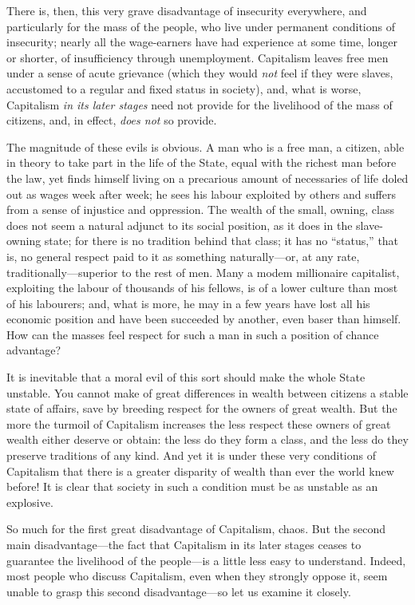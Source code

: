 \documentclass{book}
\begin{document}
There is, then, this very grave disadvantage of insecurity everywhere, and particularly for the mass of the people, who live under permanent conditions of insecurity; nearly all the wage-earners have had experience at some time, longer or shorter, of insufficiency through unemployment. Capitalism leaves free men under a sense of acute grievance (which they would \emph{not} feel if they were slaves, accustomed to a regular and fixed status in society), and, what is worse, Capitalism \emph{in its later stages} need not provide for the livelihood of the mass of citizens, and, in effect, \emph{does not} so provide.

The magnitude of these evils is obvious. A man who is a free man, a citizen, able in theory to take part in the life of the State, equal with the richest man before the law, yet finds himself living on a precarious amount of necessaries of life doled out as wages week after week; he sees his labour exploited by others and suffers from a sense of injustice and oppression. The wealth of the small, owning, class does not seem a natural adjunct to its social position, as it does in the slave-owning state; for there is no tradition behind that class; it has no “status,” that is, no general respect paid to it as something naturally—or, at any rate, traditionally—superior to the rest of men. Many a modem millionaire capitalist, exploiting the labour of thousands of his fellows, is of a lower culture than most of his labourers; and, what is more, he may in a few years have lost all his economic position and have been succeeded by another, even baser than himself. How can the masses feel respect for such a man in such a position of chance advantage?

It is inevitable that a moral evil of this sort should make the whole State unstable. You cannot make of great differences in wealth between citizens a stable state of affairs, save by breeding respect for the owners of great wealth. But the more the turmoil of Capitalism increases the less respect these owners of great wealth either deserve or obtain: the less do they form a class, and the less do they preserve traditions of any kind. And yet it is under these very conditions of Capitalism that there is a greater disparity of wealth than ever the world knew before! It is clear that society in such a condition must be as unstable as an explosive.

So much for the first great disadvantage of Capitalism, chaos. But the second main disadvantage—the fact that Capitalism in its later stages ceases to guarantee the livelihood of the people—is a little less easy to understand. Indeed, most people who discuss Capitalism, even when they strongly oppose it, seem unable to grasp this second disadvantage—so let us examine it closely.
\end{document}
